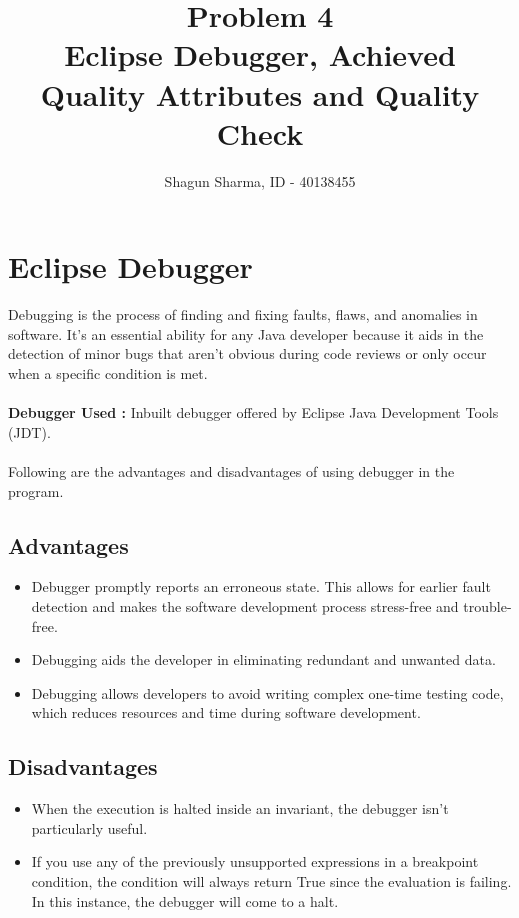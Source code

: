 \documentclass[a4paper,12pt]{article}
\title{Problem 4\\
\large Eclipse Debugger, Achieved Quality Attributes and Quality Check}
\author{Shagun Sharma, ID - 40138455}
\date{}
\begin{document}
\maketitle
\section{Eclipse Debugger}
    Debugging is the process of finding and fixing faults, flaws, and anomalies in software. It's an essential ability for any Java developer because it aids in the detection of minor bugs that aren't obvious during code reviews or only occur when a specific condition is met.
    \\ \\ \textbf{Debugger Used :} Inbuilt debugger offered by Eclipse Java Development Tools (JDT). 
    \\ \\Following are the advantages and disadvantages of using debugger in the program.
    \subsection{Advantages}
    \begin{itemize}
        \item Debugger promptly reports an erroneous state. This allows for earlier fault detection and makes the software development process stress-free and trouble-free.
        \item Debugging aids the developer in eliminating redundant and unwanted data.
        \item Debugging allows developers to avoid writing complex one-time testing code, which reduces resources and time during software development.
    \end{itemize}
    
    \subsection{Disadvantages}
    \begin{itemize}
        \item When the execution is halted inside an invariant, the debugger isn't particularly useful.
        \item If you use any of the previously unsupported expressions in a breakpoint condition, the condition will always return True since the evaluation is failing. In this instance, the debugger will come to a halt.
    \end{itemize}
\end{document}
